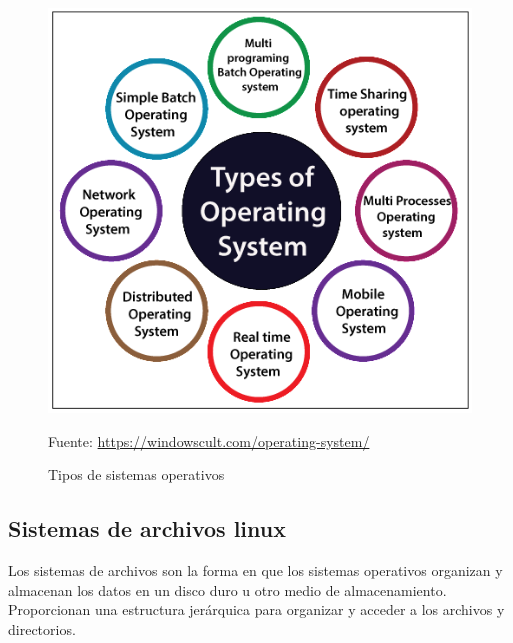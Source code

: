\documentclass[11pt,twoside]{book}
\begin{document}
\begin{figure}[htb]
  \centering
  \includegraphics[width=0.8\linewidth]{introduccion/Types-of-OS.png}
  \caption{Tipos de sistemas operativos}
  \footnotesize Fuente: \url{https://windowscult.com/operating-system/}
  \label{fig:etiqueta}
\end{figure}
\newpage
\subsection{Sistemas de archivos linux}
Los sistemas de archivos son la forma en que los sistemas operativos organizan y almacenan los datos en un disco duro u otro medio de almacenamiento. Proporcionan una estructura jerárquica para organizar y acceder a los archivos y directorios.
\end{document}
